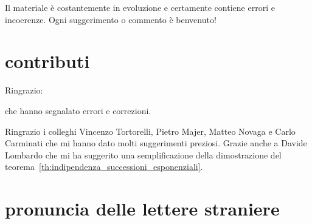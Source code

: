 Il materiale è costantemente in evoluzione %
e certamente contiene errori e incoerenze. Ogni suggerimento o commento è %
benvenuto! %

\section*{contributi}

Ringrazio:
%

%
che hanno segnalato errori e correzioni.

Ringrazio i colleghi Vincenzo Tortorelli, Pietro Majer,
Matteo Novaga e Carlo Carminati
che mi hanno dato molti suggerimenti preziosi.
Grazie anche a Davide Lombardo che mi ha suggerito una semplificazione 
della dimostrazione del teorema~\ref{th:indipendenza_successioni_esponenziali}.

\newpage

\section*{pronuncia delle lettere straniere}

